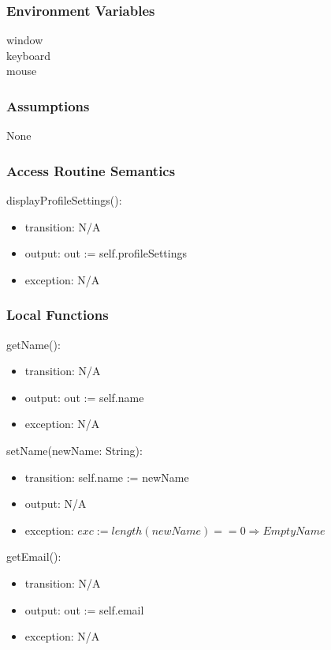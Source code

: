 \documentclass[12pt, titlepage]{article}
\begin{document}
\subsubsection{Environment Variables}

window \\
keyboard \\
mouse

\subsubsection{Assumptions}

None

\subsubsection{Access Routine Semantics}

\noindent displayProfileSettings():
\begin{itemize}
\item transition: N/A
\item output: out := self.profileSettings 
\item exception: N/A
\end{itemize}

\subsubsection{Local Functions}

\noindent getName():
\begin{itemize}
\item transition: N/A
\item output: out := self.name
\item exception: N/A
\end{itemize}

\noindent setName(newName: String):
\begin{itemize}
\item transition: self.name := newName
\item output: N/A
\item exception: $exc := length(newName) == 0 \Rightarrow EmptyName$
\end{itemize}

\noindent getEmail():
\begin{itemize}
\item transition: N/A
\item output: out := self.email
\item exception: N/A
\end{itemize}
\end{document}
